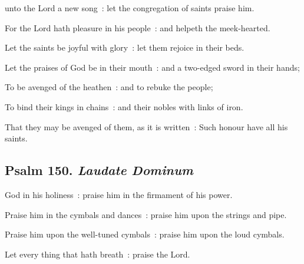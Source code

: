  unto the Lord a new song~: let the congregation of saints praise him.\par
{}
For the Lord hath pleasure in his people~: and helpeth the meek-hearted.\par
{}Let the saints be joyful with glory~: let them rejoice in their beds.\par
{}Let the praises of God be in their mouth~: and a two-edged sword in their hands;\par
{}To be avenged of the heathen~: and to rebuke the people;\par
{}To bind their kings in chains~: and their nobles with links of iron.\par
{}That they may be avenged of them, as it is written~: Such honour have all his saints.\par

\subsection{Psalm 150. \textit{Laudate Dominum}}


 God in his holiness~: praise him in the firmament of his power.\par
{}
Praise him in the cymbals and dances~: praise him upon the strings and pipe.\par
{}Praise him upon the well-tuned cymbals~: praise him upon the loud cymbals.\par
{}Let every thing that hath breath~: praise the Lord.